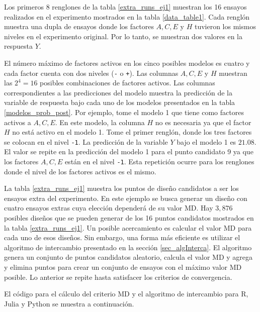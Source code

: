 Los primeros 8 renglones de la tabla \ref{extra_runs_ej1} muestran los 16 ensayos realizados en el experimento mostrados en la tabla \ref{data_table1}. Cada renglón muestra una dupla de ensayos donde los factores $A, C, E$ y $H$ tuvieron los mismos niveles en el experimento original. Por lo tanto, se muestran dos valores en la respuesta $Y$. 

El número máximo de factores activos en los cinco posibles modelos es cuatro y cada factor cuenta con dos niveles (\texttt{-} o \texttt{+}). Las columnas $A, C, E$ y $H$ muestran las $2^{4} = 16$ posibles combinaciones de factores activos. Las columnas correspondientes a las predicciones del modelo muestra la predicción de la variable de respuesta bajo cada uno de los modelos presentados en la tabla \ref{modelos_prob_post}. Por ejemplo, tome el modelo 1 que tiene como factores activos a $A, C, E$. En este modelo, la columna $H$ no es necesaria ya que el factor $H$ no está activo en el modelo 1. Tome el primer renglón, donde los tres factores se colocan en el nivel \texttt{-1}. La predicción de la variable $Y$ bajo el modelo 1 es $21.08$. El valor se repite en la predicción del modelo 1 para el punto candidato 9 ya que los factores $A, C, E$ están en el nivel \texttt{-1}. Esta repetición ocurre para los renglones donde el nivel de los factores activos es el mismo. 

La tabla \ref{extra_runs_ej1} muestra los puntos de diseño candidatos a ser los ensayos extra del experimento. En este ejemplo se busca generar un diseño con cuatro ensayos extras cuya elección dependerá de su valor MD. Hay $3,876$ posibles diseños que se pueden generar de los 16 puntos candidatos mostrados en la tabla \ref{extra_runs_ej1}. Un posible acercamiento es calcular el valor MD para cada uno de esos diseños. Sin embargo, una forma más eficiente es utilizar el algoritmo de intercambio presentado en la sección \ref{sec_algInterca}. El algoritmo genera un conjunto de puntos candidatos aleatorio, calcula el valor MD y agrega y elimina puntos para crear un conjunto de ensayos con el máximo valor MD posible. Lo anterior se repite hasta satisfacer los criterios de convergencia. 

El código para el cálculo del criterio MD y el algoritmo de intercambio para \textsf{R, Julia} y \textsf{Python} se muestra a continuación.

